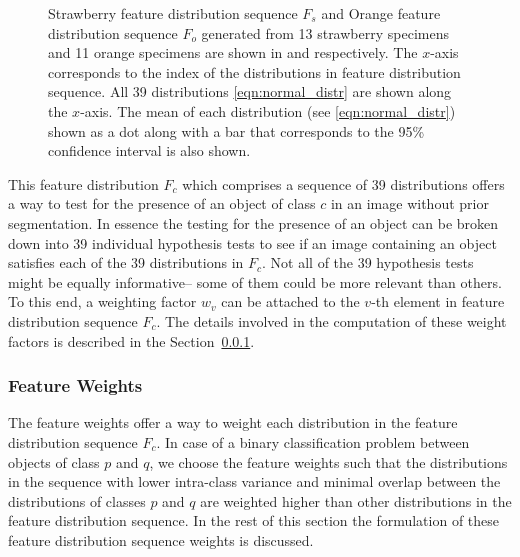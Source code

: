 \documentclass {udthesis}
\begin{document}
\begin{figure}
\begin{subfigure}[]{0.8\textwidth}
      \caption{}
      \label{fig:feat_distr_orange}
  \end{subfigure}
\caption[Feature distribution]{Strawberry feature distribution sequence $F_s$ and Orange feature distribution sequence $F_o$ generated from 13 strawberry specimens and 11 orange specimens are shown in  and  respectively. The $x$-axis corresponds to the index of the distributions in feature distribution sequence. All 39 distributions \eqref{eqn:normal_distr} are shown along the $x$-axis. The  mean of each distribution (see \eqref{eqn:normal_distr}) shown as a dot along with a bar that corresponds to the 95\% confidence interval is also shown.}
\label{fig:feat_distr}
\end{figure}	
%

This feature distribution $F_c$ which comprises a sequence of 39 distributions offers a way to test for the presence of an object of class $c$ in an image without prior segmentation. In essence the testing for the presence of an object can be broken down into 39 individual hypothesis tests to see if an image containing an object satisfies each of the 39 distributions in $F_c$. Not all of the 39 hypothesis tests might be equally informative-- some of them could be more relevant than others. To this end, a weighting factor $w_{v}$ can be attached to the $v$-th element in feature distribution sequence $F_c$.  The details involved in the computation of these weight factors is described in the Section~\ref{sec:distdes_feat_wts}.

\subsubsection{Feature Weights}
\label{sec:distdes_feat_wts}

The feature weights offer a way to weight each distribution in the feature distribution sequence $F_c$. In case of a binary classification problem between objects of class $p$ and $q$, we choose the feature weights such that the distributions in the sequence with lower intra-class variance and minimal overlap between the distributions of classes $p$ and $q$ are weighted higher than other distributions in the feature distribution sequence. In the rest of this section the formulation of these feature distribution sequence weights is discussed.
\end{document}
